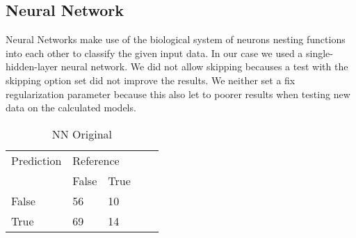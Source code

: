 \subsection{Neural Network}


Neural Networks make use of the biological system of neurons nesting functions into each other to classify the given input data. In our case we used a single-hidden-layer neural network. We did not allow skipping becauses a test with the skipping option set did not improve the results. We neither set a fix regularization parameter because this also let to poorer results when testing new data on the calculated models.


\begin{table}[!htbp]
\centering
\caption{NN Original}
\vspace{0.1cm}
\label{nn-orig}
\begin{tabular}{|l|ll|ll}
\cline{1-3}
Prediction & \multicolumn{2}{l|}{Reference} &  &  \\
           & False          & True          &  &  \\ \cline{2-3}
False      & 56              & 10             &  &  \\
True       & 69              & 14             &  &  \\ \cline{1-3}
\end{tabular}
\end{table}

